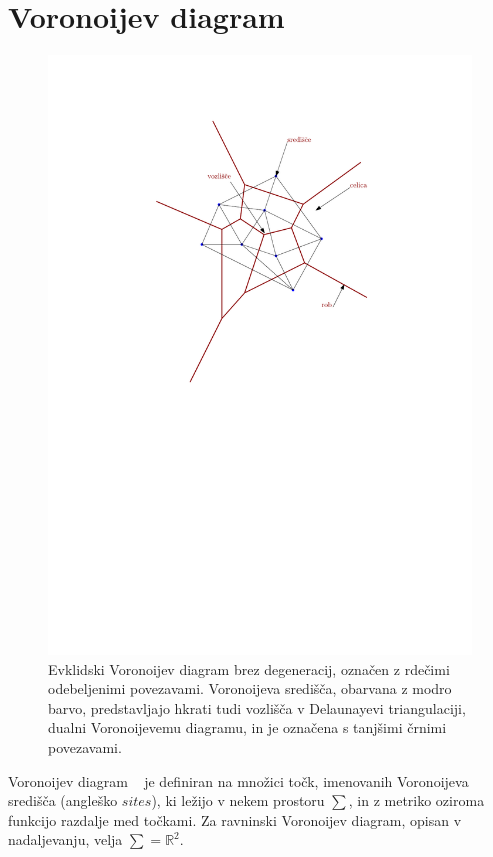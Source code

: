 \documentclass[a4paper, 12pt]{book}
\begin{document}
\section{Voronoijev diagram}
\begin{figure}
\centerline{\includegraphics[scale=0.8]{pics/voronoi-dt2.pdf}}
\caption{Evklidski Voronoijev diagram brez degeneracij, označen z rdečimi odebeljenimi povezavami. Voronoijeva središča, obarvana z modro barvo, predstavljajo hkrati tudi vozlišča v Delaunayevi triangulaciji, dualni Voronoijevemu diagramu, in je označena s tanjšimi črnimi povezavami.}
\label{vd}
\end{figure}

Voronoijev diagram ~\cite{cgalVor} je definiran na množici točk, imenovanih Voronoijeva središča (angleško $sites$), ki ležijo v nekem prostoru $\sum$, in z metriko oziroma funkcijo razdalje med točkami. Za ravninski Voronoijev diagram, opisan v nadaljevanju, velja $\sum = \mathbb{R}^2$.
\end{document}
